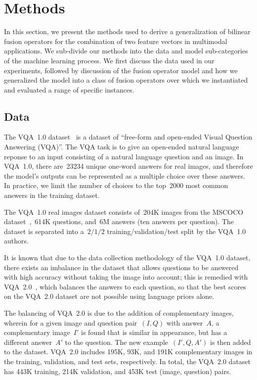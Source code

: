 \section{Methods}

In this section, we present the methods used to
derive a generalization of bilinear fusion operators for the combination of two
feature vectors in multimodal applications. We sub-divide our methods into the
data and model sub-categories of the machine learning process. We first discuss
the data used in our experiments, followed by discussion of the fusion operator
model and how we generalized the model into a class of fusion operators over
which we instantiated and evaluated a range of specific instances.


\subsection{Data}

The VQA~1.0 dataset~\cite{VQA} is a dataset of ``free-form and open-ended
Visual Question Answering (VQA)''. The VQA task is to give an open-ended
natural language reponse to an input consisting of a natural language question
and an image. In VQA~1.0, there are~\num{23234} unique one-word answers for
real images, and therefore the model's outputs can be represented as a multiple
choice over these answers. In practice, we limit the number of choices to the
top~\num{2000} most common answers in the training dataset.

The VQA~1.0 real images dataset consists of~\num{204}K images from the MSCOCO
dataset~\cite{kolda2009tensor},~\num{614}K questions, and~\num{6}M answers (ten
answers per question). The dataset is separated into a~$2/1/2$
training/validation/test split by the VQA~1.0 authors.

It is known that due to the data collection methodology of the VQA~1.0 dataset,
there exists an imbalance in the dataset that allows questions to be answered
with high accuracy without taking the image into
account; this is remedied with VQA~2.0~\cite{goyal2017making}, which balances the answers to each
question, so that the best scores on the VQA~2.0 dataset are not possible using
language priors alone.

The balancing of VQA~2.0 is due to the addition of complementary images, wherein
for a given image and question pair~$(I, Q)$ with answer~$A$, a complementary
image~$I'$ is found that is similar in appearance, but has a different answer~$A'$ to the
question. The new example~$(I', Q, A')$ is then added to the dataset. VQA~2.0
includes 195K, 93K, and 191K complementary images in the training, validation, and test
sets, respectively. In total, the VQA~2.0 dataset has 443K training, 214K validation, and
453K test (image, question) pairs.


